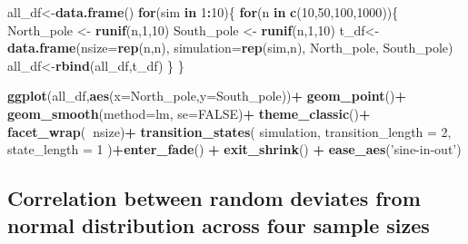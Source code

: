 \documentclass[
]{book}
\newenvironment{Shaded}{\begin{snugshade}}{\end{snugshade}}
\newcommand{\ControlFlowTok}[1]{\textcolor[rgb]{0.13,0.29,0.53}{\textbf{#1}}}
\newcommand{\DataTypeTok}[1]{\textcolor[rgb]{0.13,0.29,0.53}{#1}}
\newcommand{\DecValTok}[1]{\textcolor[rgb]{0.00,0.00,0.81}{#1}}
\newcommand{\KeywordTok}[1]{\textcolor[rgb]{0.13,0.29,0.53}{\textbf{#1}}}
\newcommand{\NormalTok}[1]{#1}
\newcommand{\OperatorTok}[1]{\textcolor[rgb]{0.81,0.36,0.00}{\textbf{#1}}}
\newcommand{\OtherTok}[1]{\textcolor[rgb]{0.56,0.35,0.01}{#1}}
\newcommand{\StringTok}[1]{\textcolor[rgb]{0.31,0.60,0.02}{#1}}
\begin{document}
\begin{Shaded}
\begin{Highlighting}[]
\NormalTok{all_df<-}\KeywordTok{data.frame}\NormalTok{()}
\ControlFlowTok{for}\NormalTok{(sim }\ControlFlowTok{in} \DecValTok{1}\OperatorTok{:}\DecValTok{10}\NormalTok{)\{}
  \ControlFlowTok{for}\NormalTok{(n }\ControlFlowTok{in} \KeywordTok{c}\NormalTok{(}\DecValTok{10}\NormalTok{,}\DecValTok{50}\NormalTok{,}\DecValTok{100}\NormalTok{,}\DecValTok{1000}\NormalTok{))\{}
\NormalTok{  North_pole <-}\StringTok{ }\KeywordTok{runif}\NormalTok{(n,}\DecValTok{1}\NormalTok{,}\DecValTok{10}\NormalTok{)}
\NormalTok{  South_pole <-}\StringTok{ }\KeywordTok{runif}\NormalTok{(n,}\DecValTok{1}\NormalTok{,}\DecValTok{10}\NormalTok{)}
\NormalTok{  t_df<-}\KeywordTok{data.frame}\NormalTok{(}\DataTypeTok{nsize=}\KeywordTok{rep}\NormalTok{(n,n),}
                   \DataTypeTok{simulation=}\KeywordTok{rep}\NormalTok{(sim,n),}
\NormalTok{                                  North_pole,}
\NormalTok{                                  South_pole)}
\NormalTok{  all_df<-}\KeywordTok{rbind}\NormalTok{(all_df,t_df)}
\NormalTok{  \}}
\NormalTok{\}}


\KeywordTok{ggplot}\NormalTok{(all_df,}\KeywordTok{aes}\NormalTok{(}\DataTypeTok{x=}\NormalTok{North_pole,}\DataTypeTok{y=}\NormalTok{South_pole))}\OperatorTok{+}
\StringTok{  }\KeywordTok{geom_point}\NormalTok{()}\OperatorTok{+}
\StringTok{  }\KeywordTok{geom_smooth}\NormalTok{(}\DataTypeTok{method=}\NormalTok{lm, }\DataTypeTok{se=}\OtherTok{FALSE}\NormalTok{)}\OperatorTok{+}
\StringTok{  }\KeywordTok{theme_classic}\NormalTok{()}\OperatorTok{+}
\StringTok{  }\KeywordTok{facet_wrap}\NormalTok{(}\OperatorTok{~}\NormalTok{nsize)}\OperatorTok{+}
\StringTok{  }\KeywordTok{transition_states}\NormalTok{(}
\NormalTok{    simulation,}
    \DataTypeTok{transition_length =} \DecValTok{2}\NormalTok{,}
    \DataTypeTok{state_length =} \DecValTok{1}
\NormalTok{  )}\OperatorTok{+}\KeywordTok{enter_fade}\NormalTok{() }\OperatorTok{+}\StringTok{ }
\StringTok{  }\KeywordTok{exit_shrink}\NormalTok{() }\OperatorTok{+}
\StringTok{  }\KeywordTok{ease_aes}\NormalTok{(}\StringTok{'sine-in-out'}\NormalTok{)}
\end{Highlighting}
\end{Shaded}

\hypertarget{correlation-between-random-deviates-from-normal-distribution-across-four-sample-sizes}{%
\subsection{Correlation between random deviates from normal distribution across four sample sizes}\label{correlation-between-random-deviates-from-normal-distribution-across-four-sample-sizes}}
\end{document}
